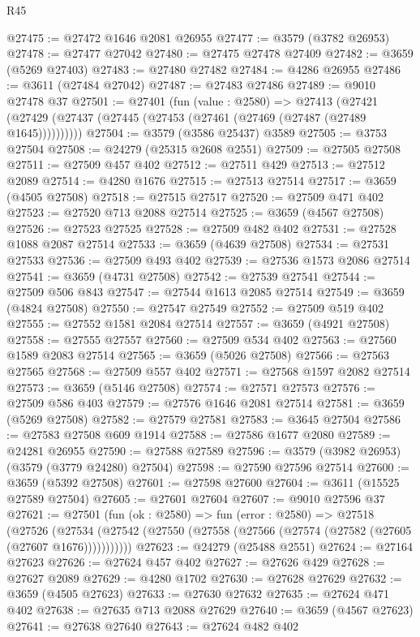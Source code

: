 \begin{lexlean}{R45}
\begin{coremodule}
@27475 := @27472 @1646 @2081 @26955
@27477 := @3579 (@3782 @26953)
@27478 := @27477 @27042
@27480 := @27475 @27478 @27409
@27482 := @3659 (@5269 @27403)
@27483 := @27480 @27482
@27484 := @4286 @26955
@27486 := @3611 (@27484 @27042)
@27487 := @27483 @27486
@27489 := @9010 @27478 @37
@27501 := @27401
    (fun (value : @2580) =>
    @27413 (@27421 (@27429 (@27437 (@27445 (@27453 (@27461 (@27469 (@27487 (@27489 @1645))))))))))
@27504 := @3579 (@3586 @25437) @3589
@27505 := @3753 @27504
@27508 := @24279 (@25315 @2608 @2551)
@27509 := @27505 @27508
@27511 := @27509 @457 @402
@27512 := @27511 @429
@27513 := @27512 @2089
@27514 := @4280 @1676
@27515 := @27513 @27514
@27517 := @3659 (@4505 @27508)
@27518 := @27515 @27517
@27520 := @27509 @471 @402
@27523 := @27520 @713 @2088 @27514
@27525 := @3659 (@4567 @27508)
@27526 := @27523 @27525
@27528 := @27509 @482 @402
@27531 := @27528 @1088 @2087 @27514
@27533 := @3659 (@4639 @27508)
@27534 := @27531 @27533
@27536 := @27509 @493 @402
@27539 := @27536 @1573 @2086 @27514
@27541 := @3659 (@4731 @27508)
@27542 := @27539 @27541
@27544 := @27509 @506 @843
@27547 := @27544 @1613 @2085 @27514
@27549 := @3659 (@4824 @27508)
@27550 := @27547 @27549
@27552 := @27509 @519 @402
@27555 := @27552 @1581 @2084 @27514
@27557 := @3659 (@4921 @27508)
@27558 := @27555 @27557
@27560 := @27509 @534 @402
@27563 := @27560 @1589 @2083 @27514
@27565 := @3659 (@5026 @27508)
@27566 := @27563 @27565
@27568 := @27509 @557 @402
@27571 := @27568 @1597 @2082 @27514
@27573 := @3659 (@5146 @27508)
@27574 := @27571 @27573
@27576 := @27509 @586 @403
@27579 := @27576 @1646 @2081 @27514
@27581 := @3659 (@5269 @27508)
@27582 := @27579 @27581
@27583 := @3645 @27504
@27586 := @27583 @27508 @609 @1914
@27588 := @27586 @1677 @2080
@27589 := @24281 @26955
@27590 := @27588 @27589
@27596 := @3579 (@3982 @26953) (@3579 (@3779 @24280) @27504)
@27598 := @27590 @27596 @27514
@27600 := @3659 (@5392 @27508)
@27601 := @27598 @27600
@27604 := @3611 (@15525 @27589 @27504)
@27605 := @27601 @27604
@27607 := @9010 @27596 @37
@27621 := @27501
    (fun (ok : @2580) =>
    fun (error : @2580) =>
    @27518
      (@27526
        (@27534 (@27542 (@27550 (@27558 (@27566 (@27574 (@27582 (@27605 (@27607 @1676)))))))))))
@27623 := @24279 (@25488 @2551)
@27624 := @27164 @27623
@27626 := @27624 @457 @402
@27627 := @27626 @429
@27628 := @27627 @2089
@27629 := @4280 @1702
@27630 := @27628 @27629
@27632 := @3659 (@4505 @27623)
@27633 := @27630 @27632
@27635 := @27624 @471 @402
@27638 := @27635 @713 @2088 @27629
@27640 := @3659 (@4567 @27623)
@27641 := @27638 @27640
@27643 := @27624 @482 @402

\end{coremodule}
\end{lexlean}
